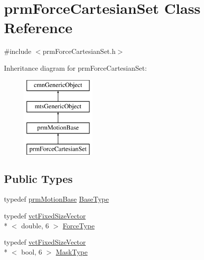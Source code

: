\hypertarget{classprm_force_cartesian_set}{\section{prm\-Force\-Cartesian\-Set Class Reference}
\label{classprm_force_cartesian_set}
}


{\ttfamily \#include $<$prm\-Force\-Cartesian\-Set.\-h$>$}

Inheritance diagram for prm\-Force\-Cartesian\-Set\-:\begin{figure}[H]
\begin{center}
\leavevmode
\includegraphics[height=4.000000cm]{d7/d74/classprm_force_cartesian_set}
\end{center}
\end{figure}
\subsection*{Public Types}
\begin{DoxyCompactItemize}
\item 
typedef \hyperlink{classprm_motion_base}{prm\-Motion\-Base} \hyperlink{classprm_force_cartesian_set_a1b8582b968aaf818d1305d80d2f7f5df}{Base\-Type}
\item 
typedef \hyperlink{classvct_fixed_size_vector}{vct\-Fixed\-Size\-Vector}\\*
$<$ double, 6 $>$ \hyperlink{classprm_force_cartesian_set_aef7a9a5a3ce601f7d1f1c752ddb36c00}{Force\-Type}
\item 
typedef \hyperlink{classvct_fixed_size_vector}{vct\-Fixed\-Size\-Vector}\\*
$<$ bool, 6 $>$ \hyperlink{classprm_force_cartesian_set_abcc1516523be27cf3b572d0d1c463db9}{Mask\-Type}
\end{DoxyCompactItemize}
